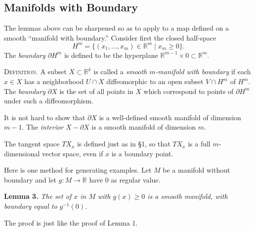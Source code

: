 \subsection{Manifolds with Boundary}

The lemmas above can be sharpened so as to apply to a map defined on a smooth ``manifold with boundary.'' Consider first the closed half-space
\[
H^m = \{(x_1, \ldots, x_m) \in \mathbb{R}^m \mid x_m \geq 0\}.
\]
The \emph{boundary} $\partial H^m$ is defined to be the hyperplane $\mathbb{R}^{m-1} \times 0 \subset \mathbb{R}^m$.

\textsc{Definition.} A subset $X \subset \mathbb{R}^k$ is called a \emph{smooth $m$-manifold with boundary} if each $x \in X$ has a neighborhood $U \cap X$ diffeomorphic to an open subset $V \cap H^m$ of $H^m$. The \emph{boundary} $\partial X$ is the set of all points in $X$ which correspond to points of $\partial H^m$ under such a diffeomorphism.

It is not hard to show that $\partial X$ is a well-defined smooth manifold of dimension $m-1$. The \emph{interior} $X - \partial X$ is a smooth manifold of dimension $m$.

The tangent space $TX_x$ is defined just as in \S1, so that $TX_x$ is a full $m$-dimensional vector space, even if $x$ is a boundary point.

Here is one method for generating examples. Let $M$ be a manifold without boundary and let $g : M \to \mathbb{R}$ have $0$ as regular value.

\noindent\textbf{Lemma 3.} \textit{The set of $x$ in $M$ with $g(x) \geq 0$ is a smooth manifold, with boundary equal to $g^{-1}(0)$.}

The proof is just like the proof of Lemma 1.

